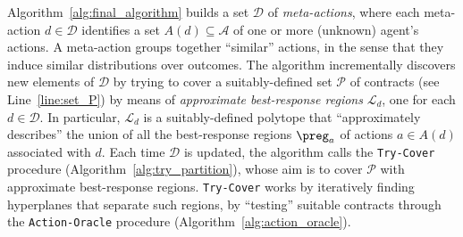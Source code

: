 \begin{figure}
\begin{minipage}{0.41\textwidth}
\begin{algorithm}[H]
\begin{algorithmic}[1]
			\end{algorithmic}
		\end{algorithm}
	\end{minipage}
\end{figure}
%
%
Algorithm~\ref{alg:final_algorithm} builds a set $\mathcal{D}$ of \emph{meta-actions}, where each meta-action $d \in \mathcal{D}$ identifies a set $A(d) \subseteq \mathcal{A}$ of one or more (unknown) agent's actions.
%
A meta-action groups together ``similar'' actions, in the sense that they induce similar distributions over outcomes.
%
The algorithm incrementally discovers new elements of $\mathcal{D}$ by trying to cover a suitably-defined set $\mathcal{P}$ of contracts (see Line~\ref{line:set_P}) by means of \emph{approximate best-response regions} $\mathcal{L}_d$, one for each $d \in \mathcal{D}$.
%
In particular, $\mathcal{L}_d$ is a suitably-defined polytope that ``approximately describes'' the union of all the best-response regions $\preg_a$ of actions $a \in A(d)$ associated with $d$.
%
Each time $\mathcal{D}$ is updated, the algorithm calls the \texttt{Try-Cover} procedure (Algorithm~\ref{alg:try_partition}), whose aim is to cover $\mathcal{P}$ with approximate best-response regions.
%
%
%
\texttt{Try-Cover} works by iteratively finding hyperplanes that separate such regions, by ``testing'' suitable contracts through the \texttt{Action-Oracle} procedure (Algorithm~\ref{alg:action_oracle}).
